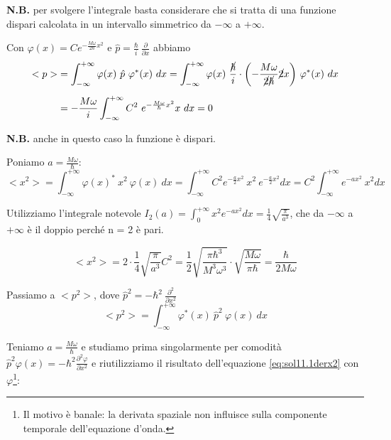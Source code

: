 \documentclass[12pt,twoside,a4]{article}
\begin{document}
\begin{solution}
\begin{enumerate}[label=(\textit{\roman*})]
\textbf{N.B.} per svolgere l'integrale basta considerare che si tratta di una funzione dispari calcolata in un intervallo simmetrico da $-\infty$ a $+\infty$.


Con $\varphi(x)=Ce^{-\frac{M\omega}{2\hbar}x^2}$ e $\hat{p} = \frac{\hbar}{i} \ \frac{\partial}{\partial x}$ abbiamo \begin{align*}
    < p > 
    &= \int_{-\infty}^{+\infty} {\varphi(x) \ \hat{p} \ \varphi^\ast(x)} \ dx 
    = \int_{-\infty}^{+\infty} {\varphi(x) \ \frac{\cancel{\hbar}}{i} \cdot \left(-\frac{M \omega}{\cancel{2}\cancel{\hbar}} \cancel{2}x\right)} \ \varphi^\ast(x) \ dx
    \\[0.5em]
    &= -\frac{M\omega}{i}\int_{-\infty}^{+\infty} {C^2 \ e^{-\frac{M \omega}{\hbar}x^2} x } \ dx = 0
\end{align*}

\textbf{N.B.} anche in questo caso la funzione è dispari. 

Poniamo $a=\frac{M\omega}{\hbar}$:
\begin{equation*}
    < x^2 > 
    = \int_{-\infty}^{+\infty} {\varphi(x)^\ast \ x^2 \ \varphi(x)} \ dx
     = \int_{-\infty}^{+\infty} C^2 e^{-\frac{a}{2}x^2} \ x^2 \ e^{-\frac{a}{2}x^2} dx 
     = C^2 \int_{-\infty}^{+\infty} e^{-ax^2} \ x^2 dx 
\end{equation*}    
    
Utilizziamo l'integrale notevole $I_2(a)=\int_{0}^{+\infty} x^2 e^{-ax^2} dx = \frac{1}{4} \sqrt{\frac{\pi}{a^3}}$, che da $-\infty$ a $+\infty$ è il doppio perché n = 2 è pari.

\begin{equation*} 
	  < x^2 > = 2 \cdot \frac{1}{4} \sqrt{\frac{\pi}{a^3}} C^2 = \frac{1}{2} \sqrt{\frac{\pi\hbar^3}{M^3 \omega^3}} \cdot \sqrt{\frac{M\omega}{\pi\hbar}} = \frac{\hbar}{2 M \omega} 
\end{equation*}

Passiamo a $<p^2>$, dove $\hat{p}^2 = -\hbar^2 \ \frac{\partial^2}{\partial x^2}$
\begin{equation*}
    < p^2 > = \int_{-\infty}^{+\infty} {\varphi^\ast(x) \ \hat{p}^2 \ \varphi(x)} \ dx  
\end{equation*}

Teniamo $a=\frac{M\omega}{\hbar}$ e studiamo prima singolarmente per comodità $\hat{p}^2 \varphi(x) = -\hbar^2 \frac{\partial^2 \varphi}{\partial x^2}$ e riutilizziamo il risultato dell'equazione \ref{eq:sol11.1derx2} con $\varphi$\footnote{Il motivo è banale: la derivata spaziale non influisce sulla componente temporale dell'equazione d'onda.}:


\end{enumerate}
\end{solution}
\end{document}
